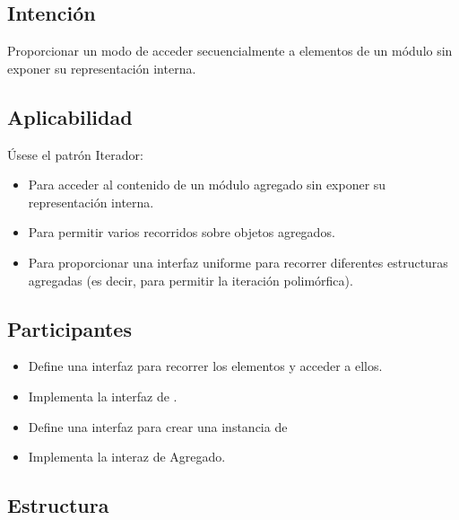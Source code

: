 \subsection*{Intención}
Proporcionar un modo de acceder secuencialmente a elementos de un módulo sin exponer su representación interna.

\subsection*{Aplicabilidad}

Úsese el patrón Iterador:
\begin{itemize}
\item Para acceder al contenido de un módulo agregado sin exponer su representación interna.
\item Para permitir varios recorridos sobre objetos agregados.
\item Para proporcionar una interfaz uniforme para recorrer diferentes estructuras agregadas (es decir, para permitir la iteración polimórfica).

\end{itemize}


\subsection*{Participantes}


\begin{itemize}
\item \Iterador Define una interfaz para recorrer los elementos y acceder a ellos.

\item \IteradorConcreto Implementa la interfaz de \Iterator.

\item \Agregado Define una interfaz para crear una instancia de \Iterator

\item \AgregadoConcreto Implementa la interaz de Agregado.

\end{itemize}


\subsection*{Estructura}


